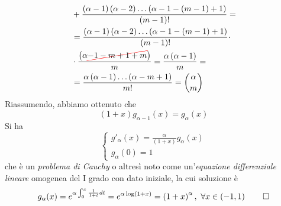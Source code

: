 \begin{demonstration}
\begin{itemize}
\begin{align*}
		&+\frac{\left(\alpha-1\right)\left(\alpha-2\right)\ldots\left(\alpha-1-\left(m-1\right)+1\right)}{\left(m-1\right)!}=\\
		&=\frac{\left(\alpha-1\right)\left(\alpha-2\right)\ldots\left(\alpha-1-\left(m-1\right)+1\right)}{\left(m-1\right)!}\cdot\\
		&\cdot\frac{\left(\alpha\Ccancel[red]{-1-m+1+m}\right)}{m}=\frac{\alpha\left(\alpha-1\right)}{m}=\\
		&=\frac{\alpha\left(\alpha-1\right)\ldots\left(\alpha-m+1\right)}{m!}=\binom{\alpha}{m}
	\end{align*}
Riassumendo, abbiamo ottenuto che
\begin{equation*}
	\left(1+x\right)g_{\alpha-1}(x)=g_\alpha(x)
\end{equation*}
Si ha
\begin{equation*}
	\begin{cases}
		g'_{\alpha}(x)=\frac{\alpha}{\left(1+x\right)}g_{\alpha}(x)\\
		g_{\alpha}\left(0\right)=1
	\end{cases}
\end{equation*}
che è un \textit{problema di Cauchy} o altresì noto come un'\textit{equazione differenziale lineare} omogenea del I grado con dato iniziale, la cui soluzione è
\begin{equation*}
	g_{\alpha}(x)=e^{\alpha\int_{0}^{x}\frac{1}{1+t}dt}=e^{\alpha\log\left(1+x\right)}=\left(1+x\right)^{\alpha},\ \forall x\in\left(-1,1\right)\qedhere
\end{equation*}
\end{itemize}
\end{demonstration}
